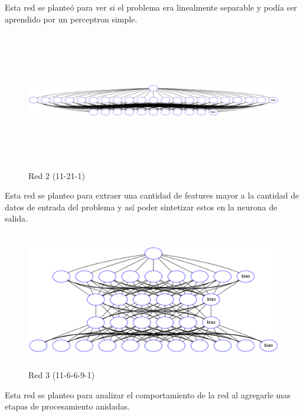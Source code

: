Esta red se planteó para ver si el problema era linealmente separable y podía ser aprendido por un perceptron simple.

\begin{figure}[H]
  \includegraphics[width=16cm, height=6cm]{../plot/11-21-1.png}
  \centering
  \caption{Red 2 (11-21-1)}
\end{figure}

Esta red se planteo para extraer una cantidad de features mayor a la cantidad de datos de entrada del problema y así poder sintetizar estos en la neurona de salida.

\begin{figure}[H]
  \includegraphics[width=12cm, height=6cm]{../plot/11-6-6-9-1.png}
  \centering
  \caption{Red 3 (11-6-6-9-1)}
\end{figure}

Esta red se planteo para analizar el comportamiento de la red al agregarle mas etapas de procesamiento anidadas.

